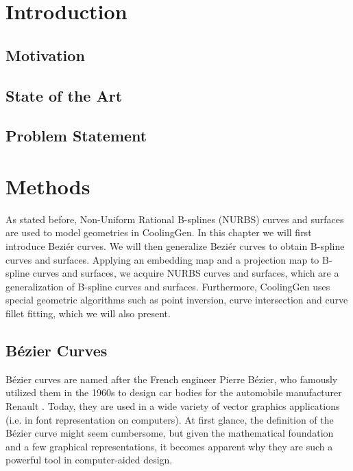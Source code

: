 \documentclass[a4paper, 11pt]{report}
\theoremstyle{definition}
\begin{document}
\restoregeometry
\begin{abstract}
	\thispagestyle{plain}
	\setcounter{page}{3}
	\lipsum[1-3]
\end{abstract}
\renewcommand{\abstractname}{Zusammenfassung}
\begin{abstract}
	\thispagestyle{plain}
	\setcounter{page}{4}
	\lipsum[4-6]
\end{abstract}
\pagebreak

\setcounter{page}{5}
\restoregeometry
\tableofcontents
\pagebreak

\restoregeometry
{}
\setcounter{page}{1}
\pagestyle{plain}

\chapter{Introduction}
\section{Motivation}
\section{State of the Art}
\section{Problem Statement}

\chapter{Methods}
As stated before, Non-Uniform Rational B-splines (NURBS) curves and surfaces are used to model geometries in CoolingGen. In this chapter we will first introduce Beziér curves. We will then generalize Beziér curves to obtain B-spline curves and surfaces. Applying an embedding map and a projection map to B-spline curves and surfaces, we acquire NURBS curves and surfaces, which are a generalization of B-spline curves and surfaces. Furthermore, CoolingGen uses special geometric algorithms such as point inversion, curve intersection and curve fillet fitting, which we will also present.

\section{Bézier Curves}
Bézier curves are named after the French engineer Pierre Bézier, who famously utilized them in the 1960s to design car bodies for the automobile manufacturer Renault \cite{Bezier1968}. Today, they are used in a wide variety of vector graphics applications (i.e. in font representation on computers). At first glance, the definition of the Bézier curve might seem cumbersome, but given the mathematical foundation and a few graphical representations, it becomes apparent why they are such a powerful tool in computer-aided design.
\end{document}
